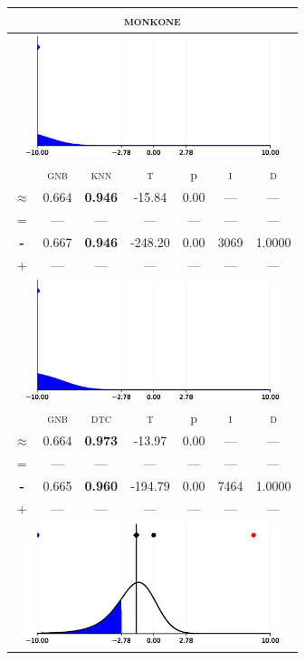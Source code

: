 \begin{tabular}{c||cc||c|c|c||c}
	\toprule
	\multicolumn{7}{c}{\textsc{monkone}}\\
	\bottomrule
	\multicolumn{7}{c}{\includegraphics[width=7.5cm, trim=30 0 30 0]{figures/monkone_0.eps}}\\

\midrule	&\textsc{gnb} & \textsc{knn} & \textsc{t} & p & \textsc{i} & \textsc{d}\\
	\color{blue} $\approx$ & \color{blue}  0.664 &\color{blue}  \bfseries 0.946 & -15.84 & 0.00 & --- & ---\\\midrule
	{\tiny=}& --- & --- & --- & --- & --- & ---\\
	{\bfseries\color{blue}\tiny-}& \color{blue}  0.667 & \color{blue} \bfseries 0.946 & -248.20 & 0.00 & 3069 & \color{blue} 1.0000\\
	{\tiny+}& --- & --- & --- & --- & --- & ---\\
	\bottomrule
	\multicolumn{7}{c}{\includegraphics[width=7.5cm, trim=30 0 30 0]{figures/monkone_1.eps}}\\

\midrule	&\textsc{gnb} & \textsc{dtc} & \textsc{t} & p & \textsc{i} & \textsc{d}\\
	\color{blue} $\approx$ & \color{blue}  0.664 &\color{blue}  \bfseries 0.973 & -13.97 & 0.00 & --- & ---\\\midrule
	{\tiny=}& --- & --- & --- & --- & --- & ---\\
	{\bfseries\color{blue}\tiny-}& \color{blue}  0.665 & \color{blue} \bfseries 0.960 & -194.79 & 0.00 & 7464 & \color{blue} 1.0000\\
	{\tiny+}& --- & --- & --- & --- & --- & ---\\
	\bottomrule
	\multicolumn{7}{c}{\includegraphics[width=7.5cm, trim=30 0 30 0]{figures/monkone_2.eps}}\\


\end{tabular}
